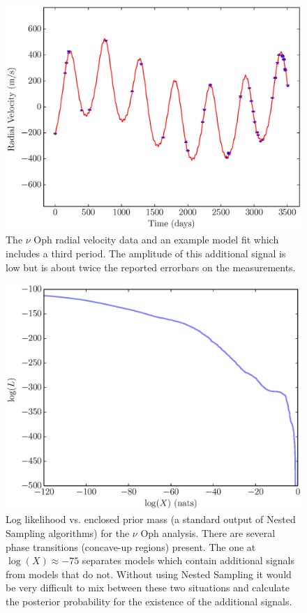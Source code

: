 \documentclass[useAMS,usenatbib]{mn2e}
\begin{document}
\begin{figure}
\includegraphics[scale=0.45]{Figures/nuoph.eps}
\caption{The $\nu$ Oph radial velocity data and an example model fit which
includes a third period. The amplitude of this additional signal is low but
is about twice the reported errorbars on the measurements.\label{fig:nuoph}}
\end{figure}

\begin{figure}
\includegraphics[scale=0.45]{Figures/logl0.eps}
\caption{Log likelihood vs. enclosed prior mass (a standard output of Nested
Sampling algorithms) for the $\nu$ Oph analysis.
There are several phase transitions (concave-up regions) present. The one at
$\log(X) \approx -75$ separates models which contain additional signals from
models that do not. Without using Nested Sampling it would be very difficult
to mix between these two situations and calculate the posterior probability
for the existence of the additional signals.
\label{fig:logl0}}
\end{figure}
\end{document}
